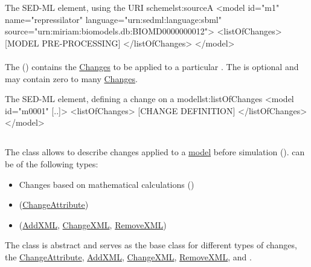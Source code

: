 \begin{myXmlLst}{The SED-ML  element, using the URI scheme}{lst:sourceA}
<model id="m1" name="repressilator" language="urn:sedml:language:sbml" 
	source="urn:miriam:biomodels.db:BIOMD0000000012">
	<listOfChanges>
		[MODEL PRE-PROCESSING]
	</listOfChanges>
</model>
\end{myXmlLst}



\paragraph*{}
\label{sec:changesModel}
The  () contains the \hyperref[class:change]{Changes} to be applied to a particular \Model. The  is optional and may contain zero to many \hyperref[class:change]{Changes}.

\begin{myXmlLst}{The SED-ML  element, defining a change on a model}{lst:listOfChanges}
<model id="m0001" [..]>
	<listOfChanges>
		[CHANGE DEFINITION]
	</listOfChanges>
</model>
\end{myXmlLst}

\subsection{}
\label{class:change}
The  class allows to describe changes applied to a \hyperref[class:model]{model} before simulation ().  can be of the following types:
\begin{itemize}
	\item{Changes based on mathematical calculations (\ComputeChange)} 
	\item{ (\hyperref[class:changeAttribute]{ChangeAttribute})}
	\item{ (\hyperref[class:addXml]{AddXML}, \hyperref[class:changeXml]{ChangeXML}, \hyperref[class:removeXml]{RemoveXML})}
\end{itemize}

The  class is abstract and serves as the base class for different types of changes, the \hyperref[class:changeAttribute]{ChangeAttribute}, \hyperref[class:addXml]{AddXML}, \hyperref[class:changeXml]{ChangeXML}, \hyperref[class:removeXml]{RemoveXML}, and \ComputeChange.

